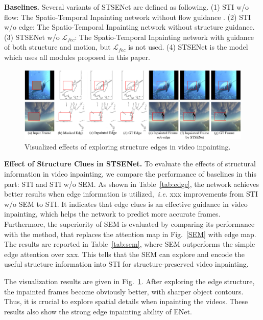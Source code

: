 \noindent \textbf{Baselines.} Several variants of STSENet are defined as following. (1) STI w/o flow: The Spatio-Temporal Inpainting network without flow guidance . (2) STI w/o edge: The Spatio-Temporal Inpainting network without structure guidance. (3) STSENet w/o $\mathcal{L}_{fec}$: The Spatio-Temporal Inpainting network with guidance of both structure and motion, but $\mathcal{L}_{fec}$ is not used. (4) STSENet is the model which uses all modules proposed in this paper. 



\begin{figure}[t]
	\centering
	\includegraphics[width=1.0\columnwidth]{edgevis} %
	\caption{Visualized effects of exploring structure edges in video inpainting.}
	\label{edgevis}
\end{figure}


\noindent \textbf{Effect of Structure Clues in STSENet.}
To evaluate the effects of structural information in video inpainting, we compare the performance of baselines in this part: STI and STI w/o SEM.
As shown in Table~\ref{tab:edge}, the network achieves better results when edge information is utilized,~\emph{i.e.} xxx improvements from STI w/o SEM to STI. It indicates that edge clues is an effective guidance in video inpainting, which helps the network to predict more accurate frames.
Furthermore, the superiority of SEM is evaluated by comparing its performance with the method, that replaces the attention map in Fig.~\ref{SEM} with edge map.
The results are reported in Table~\ref{tab:sem}, where SEM outperforms the simple edge attention over xxx.
This tells that the SEM can explore and encode the useful structure information into STI for structure-preserved video inpainting.

The visualization results are given in Fig.~\ref{edgevis}.
After exploring the edge structure, the inpainted frames become obviously better, with sharper object contours.
Thus, it is crucial to explore spatial details when inpainting the videos.
These results also show the strong edge inpainting ability of ENet.



